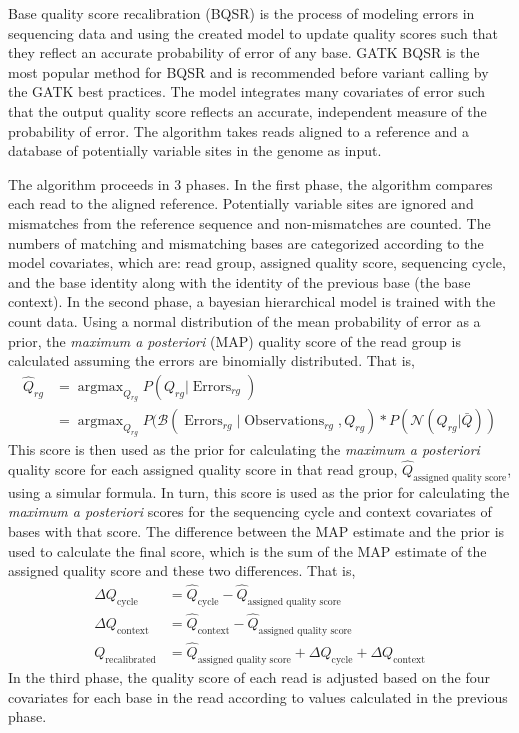 Base quality score recalibration (BQSR) is the process of modeling errors in sequencing data and using the created model to update quality scores such that they reflect an accurate probability of error of any base.
GATK BQSR  is the most popular method for BQSR and is recommended before variant calling by the GATK best practices. %
The model integrates many covariates of error such that the output quality score reflects an accurate, independent measure of the probability of error.
The algorithm takes reads aligned to a reference and a database of potentially variable sites in the genome as input.

The algorithm proceeds in 3 phases.
In the first phase, the algorithm compares each read to the aligned reference. Potentially variable sites are ignored and mismatches from the reference sequence and non-mismatches are counted. The numbers of matching and mismatching bases are categorized according to the model covariates, which are: read group, assigned quality score, sequencing cycle, and the base identity along with the identity of the previous base (the base context).
In the second phase, a bayesian hierarchical model is trained with the count data. Using a normal distribution of the mean probability of error as a prior, the \textit{maximum a posteriori} (MAP) quality score of the read group is calculated assuming the errors are binomially distributed. That is,
\begin{align}
\hat{Q}_{rg} &= \operatorname{argmax}_{Q_{rg}} P(Q_{rg}|\operatorname{Errors}_{rg}) \\
&= \operatorname{argmax}_{Q_{rg}} P(\mathcal{B}(\operatorname{Errors}_{rg} | \operatorname{Observations}_{rg}, Q_{rg}) * P(\mathcal{N}(Q_{rg} | \bar{Q}))
\end{align}
This score is then used as the prior for calculating the \textit{maximum a posteriori} quality score for each assigned quality score in that read group, $\hat{Q}_{\operatorname{assigned\:quality\:score}}$, using a simular formula.
In turn, this score is used as the prior for calculating the \textit{maximum a posteriori} scores for the sequencing cycle and context covariates of bases with that score. The difference between the MAP estimate and the prior is used to calculate the final score, which is the sum of the MAP estimate of the assigned quality score and these two differences. That is,
\begin{align}
\Delta Q_{\operatorname{cycle}} &= \hat{Q}_{\operatorname{cycle}} - \hat{Q}_{\operatorname{assigned\:quality\:score}} \\
\Delta Q_{\operatorname{context}} &= \hat{Q}_{\operatorname{context}} - \hat{Q}_{\operatorname{assigned\:quality\:score}} \\
Q_{\operatorname{recalibrated}} &= \hat{Q}_{\operatorname{assigned\:quality\:score}} + \Delta Q_{\operatorname{cycle}} + \Delta Q_{\operatorname{context}}
\end{align}
In the third phase, the quality score of each read is adjusted based on the four covariates for each base in the read according to values calculated in the previous phase.

